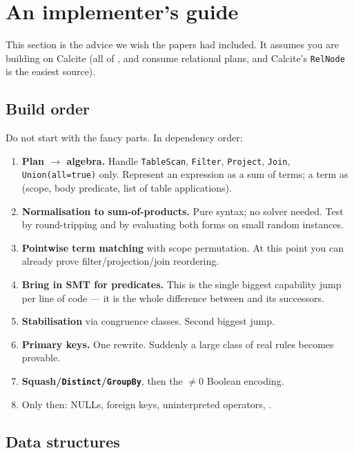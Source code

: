 \section{An implementer's guide}
\label{sec:impl}

This section is the advice we wish the papers had included. It assumes you are building on
Calcite (all of \spes{}, \QED{} and \sqlsolver{} consume relational plans, and Calcite's
\texttt{RelNode} is the easiest source).

\subsection{Build order}

Do not start with the fancy parts. In dependency order:

\begin{enumerate}
\item \textbf{Plan $\to$ algebra.} Handle \texttt{TableScan}, \texttt{Filter},
      \texttt{Project}, \texttt{Join}, \texttt{Union(all=true)} only. Represent an expression
      as a sum of terms; a term as (scope, body predicate, list of table applications).
\item \textbf{Normalisation to sum-of-products.} Pure syntax; no solver needed. Test by
      round-tripping and by evaluating both forms on small random instances.
\item \textbf{Pointwise term matching} with scope permutation. At this point you can already
      prove filter/projection/join reordering.
\item \textbf{Bring in SMT for predicates.} This is the single biggest capability jump per
      line of code --- it is the whole difference between \udp{} and its successors.
\item \textbf{Stabilisation} via congruence classes. Second biggest jump.
\item \textbf{Primary keys.} One rewrite. Suddenly a large class of real rules becomes
      provable.
\item \textbf{Squash/\texttt{Distinct}/\texttt{GroupBy}}, then the $\neq0$ Boolean encoding.
\item Only then: NULLs, foreign keys, uninterpreted operators, \liastar{}.
\end{enumerate}

\subsection{Data structures}

